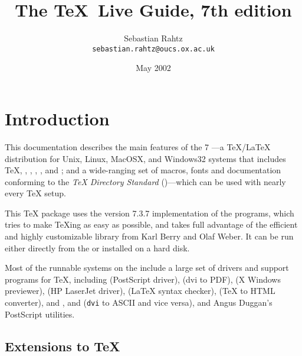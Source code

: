 \documentclass{article}
\def\Dash{---}
\begin{document}
\author{Sebastian Rahtz\\
\texttt{sebastian.rahtz@oucs.ox.ac.uk}
}
\title{The \protect\TeX\ Live Guide, 7th edition}
\date{May 2002}
\maketitle
\begin{multicols}{2}
\tableofcontents
\listoftables
\end{multicols}
\section{Introduction}\label{sec:intro}
This documentation describes the
  main features of the \TeXLive{} 7 \CD{}\Dash a \TeX{}/\LaTeX{}
  distribution for Unix, Linux, MacOSX, and Windows32 systems that includes
  \TeX{}, \LaTeXe{}, \MF, \MP, , and \BibTeX{}; and
  a wide-ranging set of macros, fonts and documentation conforming to
  the \emph{\TeX{} Directory Standard} (\TDS{})\Dash which can be used
  with nearly every \TeX{} setup.
  
  This \TeX{} package uses the \Webc{} version 7.3.7
  implementation of the programs, which tries to make \TeX{}ing as
  easy as possible, and takes full advantage of the efficient and
  highly customizable \KPS{} library from Karl Berry and Olaf Weber.
  It can be run either directly from the \CD{} or installed on a hard
  disk.

Most of the runnable systems on the \CD{} include a large set of
drivers and support programs for \TeX, including 
(PostScript driver),  (dvi to PDF),
 (X Windows previewer),
 (HP LaserJet driver),  (\LaTeX{}
syntax checker),  (\TeX{} to HTML converter),
 and ,  and
   (\texttt{dvi} to ASCII and vice versa), and Angus
  Duggan's PostScript utilities.

\subsection{Extensions to \TeX}
\end{document}
